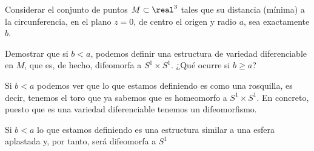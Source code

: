 \begin{problem}[14]
Considerar el conjunto de puntos $M \subset \real^3$ tales que su distancia (mínima) a la circunferencia, en el plano $z=0$, de centro el origen y radio $a$, sea exactamente $b$.

Demostrar que si $b< a$, podemos definir una estructura de variedad diferenciable en $M$, que es, de hecho, difeomorfa a $S^1 \times S^1$. ¿Qué ocurre si $b \geq a$?

\solution


Si $b<a$ podemos ver que lo que estamos definiendo es como una rosquilla, es decir, tenemos el toro que ya sabemos que es homeomorfo a $S^1 \times S^1$. En concreto, puesto que es una variedad diferenciable tenemos un difeomorfismo.

Si $b<a$ lo que estamos definiendo es una estructura similar a una esfera aplastada y, por tanto, será difeomorfa a $S^1$

\end{problem}

